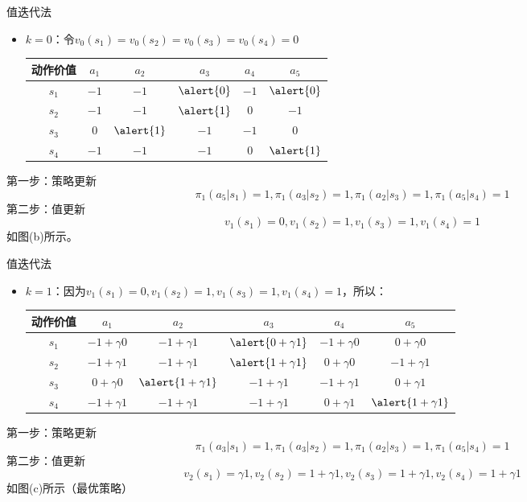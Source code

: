 \begin{frame}{值迭代法}
    \begin{itemize}
        \item $k=0$：令$v_0(s_1)=v_0(s_2)=v_0(s_3)=v_0(s_4)=0$
        \begin{table}[]
            \begin{tabular}{@{}cccccc@{}}
            \toprule
            动作价值    & $a_1$ & $a_2$ & $a_3$ & $a_4$ & $a_5$ \\ \midrule
            $s_1$ & $-1$ & $-1$ & $\alert{0}$ & $-1$ & $\alert{0}$ \\
            $s_2$ & $-1$ & $-1$ & $\alert{1}$ & $0$ & $-1$ \\
            $s_3$ & $0$ & $\alert{1}$ & $-1$ & $-1$ & $0$ \\
            $s_4$ & $-1$ & $-1$ & $-1$ & $0$ & $\alert{1}$ \\ \bottomrule
            \end{tabular}
        \end{table}
    \end{itemize}
        第一步：策略更新
        \[
            \pi_1(a_5|s_1)=1, \pi_1(a_3|s_2)=1, \pi_1(a_2|s_3)=1, \pi_1(a_5|s_4)=1
        \]
        第二步：值更新
        \[
            v_1(s_1)=0,v_1(s_2)=1,v_1(s_3)=1,v_1(s_4)=1
        \]
        如图(b)所示。
\end{frame}

\begin{frame}{值迭代法}
    \begin{itemize}
        \item $k=1$：因为$v_1(s_1)=0,v_1(s_2)=1,v_1(s_3)=1,v_1(s_4)=1$，所以：
        \begin{table}[]
            \begin{tabular}{@{}cccccc@{}}
            \toprule
            动作价值    & $a_1$ & $a_2$ & $a_3$ & $a_4$ & $a_5$ \\ \midrule
            $s_1$ & $-1+\gamma 0$ & $-1+\gamma 1$ & $\alert{0+\gamma 1}$ & $-1+\gamma 0$ & $0+\gamma 0$ \\
            $s_2$ & $-1+\gamma 1$ & $-1+\gamma 1$ & $\alert{1+\gamma 1}$ & $0+\gamma 0$ & $-1+\gamma 1$ \\
            $s_3$ & $0+\gamma 0$ & $\alert{1+\gamma 1}$ & $-1+\gamma 1$ & $-1+\gamma 1$ & $0+\gamma 1$ \\
            $s_4$ & $-1+\gamma 1$ & $-1+\gamma 1$ & $-1+\gamma 1$ & $0+\gamma 1$ & $\alert{1+\gamma 1}$ \\ \bottomrule
            \end{tabular}
        \end{table}
    \end{itemize}
        第一步：策略更新
        \[
            \pi_1(a_3|s_1)=1, \pi_1(a_3|s_2)=1, \pi_1(a_2|s_3)=1, \pi_1(a_5|s_4)=1
        \]
        第二步：值更新
        \[
            v_2(s_1)=\gamma 1,v_2(s_2)=1+\gamma 1,v_2(s_3)=1+\gamma 1,v_2(s_4)=1+\gamma 1
        \]
        如图(c)所示（最优策略）
\end{frame}

